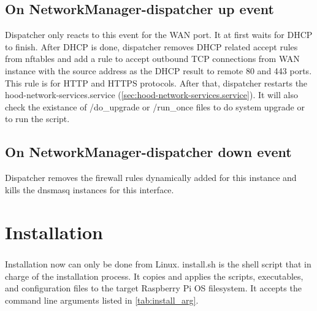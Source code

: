 \documentclass[mscthesis]{usiinfthesis}
\begin{document}
\section{On NetworkManager-dispatcher up event}
Dispatcher only reacts to this event for the WAN port. It at first waits for DHCP to finish. After DHCP is done, dispatcher removes DHCP related accept rules from nftables and add a rule to accept outbound TCP connections from WAN instance with the source address as the DHCP result to remote 80 and 443 ports. This rule is for HTTP and HTTPS protocols. After that, dispatcher restarts the hood-network-services.service (\cref{sec:hood-network-services.service}). It will also check the existance of /do\_upgrade or /run\_once files to do system upgrade or to run the script.

\section{On NetworkManager-dispatcher down event}
Dispatcher removes the firewall rules dynamically added for this instance and kills the dnsmasq instances for this interface.

\chapter{Installation}
\paragraph{}
Installation now can only be done from Linux. install.sh is the shell script that in charge of the installation process. It copies and applies the scripts, executables, and configuration files to the target Raspberry Pi OS filesystem. It accepts the command line arguments listed in \cref{tab:install_arg}.
\end{document}
